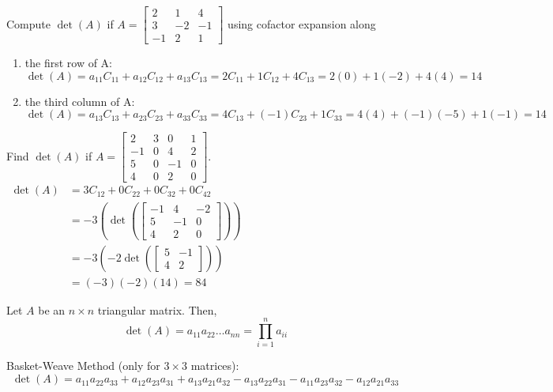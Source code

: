 \documentclass[12pt]{article}
\begin{document}
  \begin{example} Compute $\det(A)$ if $A = \begin{bmatrix} 2 & 1 & 4 \\ 3 & -2 & -1 \\ -1 & 2 & 1 \end{bmatrix} $ using cofactor expansion along \begin{enumerate} \item the first row of A: $\det(A) = a_{11}C_{11} + a_{12}C_{12} + a_{13}C_{13} = 2C_{11} + 1C_{12} + 4C_{13} = 2(0) + 1(-2) + 4(4) = 14 $
  \item the third column of A: $\det(A) = a_{13}C_{13} + a_{23}C_{23} + a_{33}C_{33} = 4C_{13} + (-1)C_{23} + 1C_{33} = 4(4) + (-1)(-5) + 1(-1) = 14 $ \end{enumerate} \end{example}
  \begin{example} Find $\det(A)$ if $A = \begin{bmatrix} 2 & 3 & 0 & 1 \\ -1 & 0 & 4 & 2 \\ 5 & 0 & -1 & 0 \\ 4 & 0 & 2 & 0 \end{bmatrix} $. \newline
  $\begin{aligned} \det(A) &= 3C_{12} + 0C_{22} + 0C_{32} + 0C_{42} \\ &= -3(\det(\begin{bmatrix} -1 & 4 & -2 \\ 5 & -1 & 0 \\ 4 & 2 & 0 \end{bmatrix})) \\ &= -3(-2\det(\begin{bmatrix} 5 & -1 \\ 4 & 2 \end{bmatrix})) \\ &= (-3)(-2)(14) = 84 \end{aligned} $ \end{example}
  \begin{theorem} Let $A$ be an $n \times n$ triangular matrix. Then, $$\det(A) = a_{11}a_{22}\dots a_{nn} = \prod\limits_{i = 1}^n a_{ii} $$ \end{theorem} 
  Basket-Weave Method (only for $3 \times 3$ matrices): 
  $$ \det(A) = a_{11}a_{22}a_{33} + a_{12}a_{23}a_{31} + a_{13}a_{21}a_{32} - a_{13}a_{22}a_{31} - a_{11}a_{23}a_{32} - a_{12}a_{21}a_{33} $$ 
  
\end{document}

